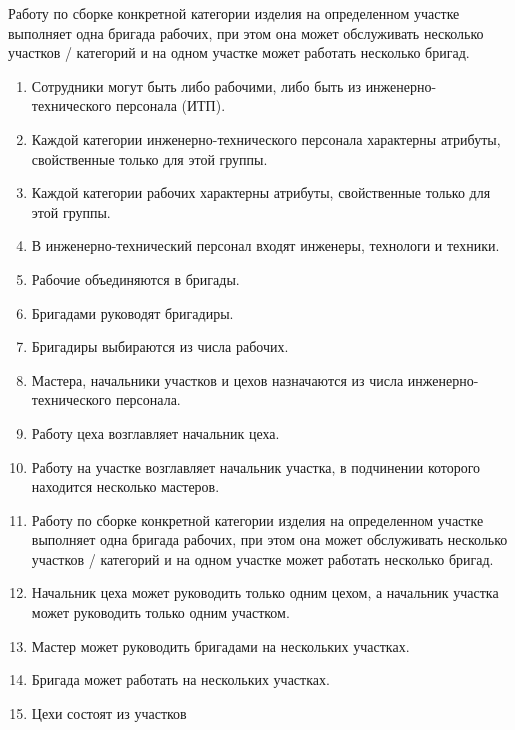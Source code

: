 Работу по сборке конкретной категории изделия на определенном участке выполняет одна бригада рабочих, при этом она может обслуживать несколько участков / категорий и на одном участке может работать несколько бригад.

\begin{enumerate}

    \item Сотрудники могут быть либо рабочими, либо быть из инженерно-технического персонала (ИТП).
    \item Каждой категории инженерно-технического персонала характерны атрибуты, свойственные только для этой группы.
    \item Каждой категории рабочих характерны атрибуты, свойственные только для этой группы.
    \item В инженерно-технический персонал входят инженеры, технологи и техники.
    \item Рабочие объединяются в бригады.
    \item Бригадами руководят бригадиры.
    \item Бригадиры выбираются из числа рабочих.
    \item Мастера, начальники участков и цехов назначаются из числа инженерно-технического персонала.
    \item Работу цеха возглавляет начальник цеха.
    \item Работу на участке возглавляет начальник участка, в подчинении которого находится несколько мастеров.
    \item Работу по сборке конкретной категории изделия на определенном участке выполняет одна бригада рабочих, при этом она может обслуживать несколько участков / категорий и на одном участке может работать несколько бригад.
    \item Начальник цеха может руководить только одним цехом, а начальник участка может руководить только одним участком.
    \item Мастер может руководить бригадами на нескольких участках.
    \item Бригада может работать на нескольких участках.

    \item Цехи состоят из участков

\end{enumerate}

